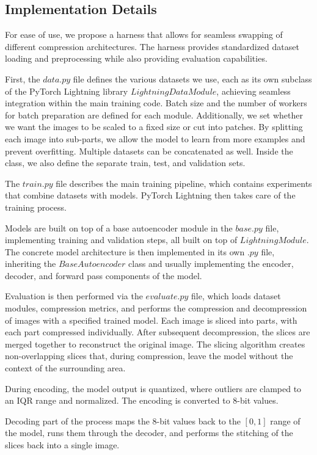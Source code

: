 \documentclass[conference]{IEEEtran}
\begin{document}
\subsection{Implementation Details}
For ease of use, we propose a harness that allows for seamless swapping of different compression architectures. The harness provides standardized dataset loading and preprocessing while also providing evaluation capabilities.

First, the $data.py$ file defines the various datasets we use, each as its own subclass of the PyTorch Lightning \cite{noauthor_pytorch_nodate} library $LightningDataModule$, achieving seamless integration within the main training code. Batch size and the number of workers for batch preparation are defined for each module. Additionally, we set whether we want the images to be scaled to a fixed size or cut into patches. By splitting each image into sub-parts, we allow the model to learn from more examples and prevent overfitting. Multiple datasets can be concatenated as well. Inside the class, we also define the separate train, test, and validation sets. 

The $train.py$ file describes the main training pipeline, which contains experiments that combine datasets with models. PyTorch Lightning then takes care of the training process.

Models are built on top of a base autoencoder module in the $base.py$ file, implementing training and validation steps, all built on top of $LightningModule$. The concrete model architecture is then implemented in its own $.py$ file, inheriting the $BaseAutoencoder$ class and usually implementing the encoder, decoder, and forward pass components of the model.

Evaluation is then performed via the $evaluate.py$ file, which loads dataset modules, compression metrics, and performs the compression and decompression of images with a specified trained model. 
Each image is sliced into parts, with each part compressed individually. After subsequent decompression, the slices are merged together to reconstruct the original image. The slicing algorithm creates non-overlapping slices that, during compression, leave the model without the context of the surrounding area.

During encoding, the model output is quantized, where outliers are clamped to an IQR range and normalized. The encoding is converted to 8-bit values.

Decoding part of the process maps the 8-bit values back to the $[0, 1]$ range of the model, runs them through the decoder, and performs the stitching of the slices back into a single image.
\end{document}
